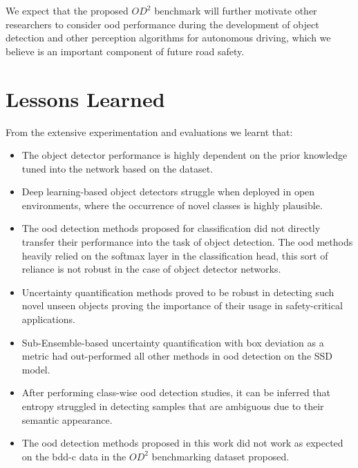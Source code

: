     
    We expect that the proposed $OD^2$ benchmark will further motivate other researchers to consider \acrshort{ood} performance during the development of object detection and other perception algorithms for autonomous driving, which we believe is an important component of future road safety.

    \section{Lessons Learned}
    From the extensive experimentation and evaluations we learnt that:
    \begin{itemize}
        \item The object detector performance is highly dependent on the prior knowledge tuned into the network based on the dataset. 
        \item Deep learning-based object detectors struggle when deployed in open environments, where the occurrence of novel classes is highly plausible.
        \item The \acrshort{ood} detection methods proposed for classification did not directly transfer their performance into the task of object detection. The \acrshort{ood} methods heavily relied on the softmax layer in the classification head, this sort of reliance is not robust in the case of object detector networks.
        \item Uncertainty quantification methods proved to be robust in detecting such novel unseen objects proving the importance of their usage in safety-critical applications.
        \item Sub-Ensemble-based uncertainty quantification with box deviation as a metric had out-performed all other methods in \acrshort{ood} detection on the SSD model.
        \item After performing class-wise \acrshort{ood} detection studies, it can be inferred that entropy struggled in detecting samples that are ambiguous due to their semantic appearance.
        \item The \acrshort{ood} detection methods proposed in this work did not work as expected on the \acrshort{bdd-c} data in the $OD^2$ benchmarking dataset proposed.
    \end{itemize}

